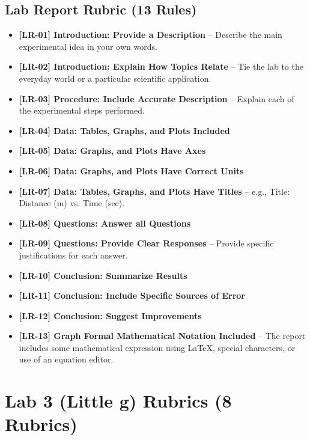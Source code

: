 \documentclass{article}
\begin{document}
\subsection*{Lab Report Rubric (13 Rules)}
\begin{itemize}
\item \textbf{ [LR-01] Introduction: Provide a Description } –  Describe the main experimental idea in your own words.
\item \textbf{ [LR-02] Introduction:  Explain How Topics Relate } – Tie the lab to the everyday world or a particular scientific application.
\item \textbf{ [LR-03] Procedure: Include Accurate Description } – Explain each of the experimental steps performed.
\item \textbf{ [LR-04] Data: Tables, Graphs, and Plots Included }
\item \textbf{ [LR-05] Data:  Graphs, and Plots Have Axes }
\item \textbf{ [LR-06] Data: Graphs, and Plots Have Correct Units }
\item \textbf{ [LR-07] Data: Tables, Graphs, and Plots Have Titles } – e.g., Title: Distance (m) vs. Time (sec).
\item \textbf{ [LR-08] Questions:  Answer all Questions } 
\item \textbf{ [LR-09] Questions:  Provide Clear Responses } – Provide specific justifications for each answer.
\item \textbf{ [LR-10] Conclusion:  Summarize Results }
\item \textbf{ [LR-11] Conclusion:  Include Specific Sources of Error }
\item \textbf{ [LR-12] Conclusion:  Suggest Improvements }
\item \textbf{ [LR-13] Graph Formal Mathematical Notation Included } –  The report includes some mathematical expression using LaTeX, special characters, or use of an equation editor. 
\end{itemize}

\section*{Lab 3 (Little g) Rubrics (8 Rubrics)}
\end{document}
